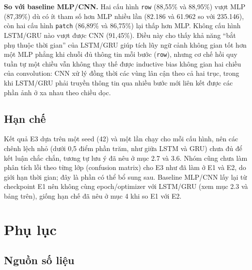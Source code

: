 \documentclass[12pt,a4paper]{article}
\begin{document}
\textbf{So với baseline MLP/CNN.} Hai cấu hình \texttt{row} (88,55\% và
88,95\%) vượt MLP (87,39\%) dù có ít tham số hơn MLP nhiều lần (82.186 và
61.962 so với 235.146), còn hai cấu hình \texttt{patch} (86,89\% và 86,75\%)
lại thấp hơn MLP. Không cấu hình LSTM/GRU nào vượt được CNN (91,45\%). Điều
này cho thấy khả năng “bắt phụ thuộc thời gian” của LSTM/GRU giúp tích lũy
ngữ cảnh không gian tốt hơn một MLP phẳng khi chuỗi đủ thông tin mỗi bước
(\texttt{row}), nhưng cơ chế hồi quy tuần tự một chiều vẫn không thay thế
được inductive bias không gian hai chiều của convolution: CNN xử lý đồng thời
các vùng lân cận theo cả hai trục, trong khi LSTM/GRU phải truyền thông tin
qua nhiều bước mới liên kết được các phần ảnh ở xa nhau theo chiều dọc.

\subsection{Hạn chế}

Kết quả E3 dựa trên một seed (42) và một lần chạy cho mỗi cấu hình, nên các
chênh lệch nhỏ (dưới 0,5 điểm phần trăm, như giữa LSTM và GRU) chưa đủ để kết
luận chắc chắn, tương tự lưu ý đã nêu ở mục 2.7 và 3.6. Nhóm cũng chưa làm
phân tích lỗi theo từng lớp (confusion matrix) cho E3 như đã làm ở E1 và E2,
do giới hạn thời gian; đây là phần có thể bổ sung sau. Baseline MLP/CNN lấy
lại từ checkpoint E1 nên không cùng epoch/optimizer với LSTM/GRU (xem mục 2.3
và bảng trên), giống hạn chế đã nêu ở mục 4 khi so E1 với E2.

\clearpage
\section*{Phụ lục}

\subsection*{Nguồn số liệu}
\end{document}
